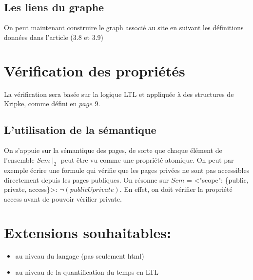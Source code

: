 \documentclass[a4paper]{article}
\begin{document}
\subsection*{ Les liens du graphe\\ }
On peut maintenant construire le graph associé au site en suivant les définitions données dans l'article (3.8 et 3.9)\\
\section*{ Vérification des propriétés \\ }
La vérification sera basée sur la logique LTL et appliquée à des structures de Kripke, comme défini en $page$ $9$.\\
\subsection*{ L'utilisation de la sémantique }
On s'appuie sur la sémantique des pages, de sorte que chaque élément de l'ensemble $Sem \mid_2$ peut être vu comme une propriété atomique. On peut par exemple écrire une formule qui vérifie que les pages privées ne sont pas accessibles directement depuis les pages publiques. On résonne sur $Sem$ = <"scope": \{public, private, access\}>: $\neg(public U private)$. En effet, on doit vérifier la propriété access avant de pouvoir vérifier private.\\
\section*{ Extensions souhaitables: }
\begin{itemize}
\item au niveau du langage (pas seulement html)
\item au niveau de la quantification du temps en LTL
\end{itemize}
\end{document}
